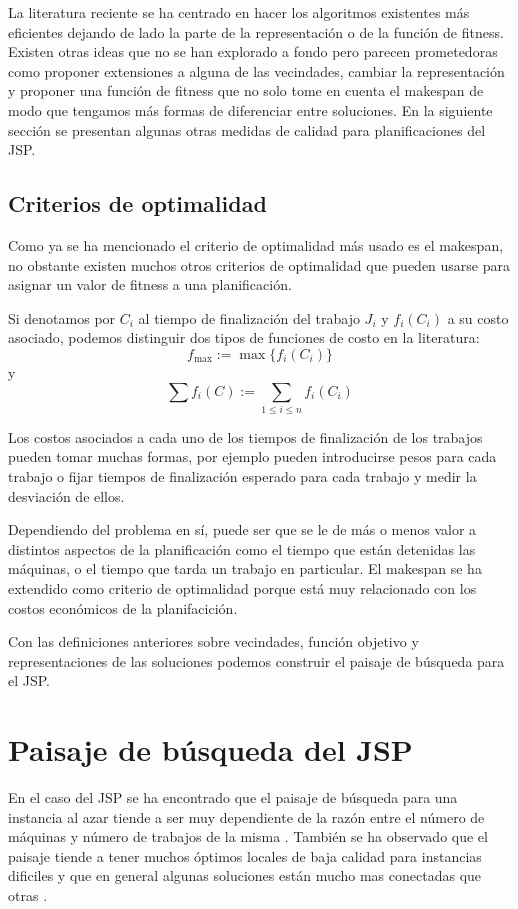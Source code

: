 La literatura reciente se ha centrado en hacer los algoritmos existentes más eficientes dejando de lado la parte de la representación o de la función de fitness. Existen otras ideas que no se han explorado a fondo pero parecen prometedoras como proponer extensiones a alguna de las vecindades, cambiar la representación y proponer una función de fitness que no solo tome en cuenta el makespan de modo que tengamos más formas de diferenciar entre soluciones. En la siguiente sección se presentan algunas otras medidas de calidad para planificaciones del JSP.
\subsection*{Criterios de optimalidad}
Como ya se ha mencionado el criterio de optimalidad más usado es el makespan, no obstante existen muchos otros criterios de optimalidad que pueden usarse para asignar un valor de fitness a una planificación. 

Si denotamos por $C_i$ al tiempo de finalización del trabajo $J_i$ y $f_i(C_i)$ a su costo asociado, podemos distinguir dos tipos de funciones de costo en la literatura\cite{Brucker2001}:
\[f_{\max}:=\max\{f_i(C_i)\}\]
y 
\[\sum f_i(C):=\sum_{1\leq i\leq n}f_i(C_i)\]

Los costos asociados a cada uno de los tiempos de finalización de los trabajos pueden tomar muchas formas, por ejemplo pueden introducirse pesos para cada trabajo o fijar tiempos de finalización esperado para cada trabajo y medir la desviación de ellos.

Dependiendo del problema en sí, puede ser que se le de más o menos valor a distintos aspectos de la planificación como el tiempo que están detenidas las máquinas, o el tiempo que tarda un trabajo en particular. El makespan se ha extendido como criterio de optimalidad porque está muy relacionado con los costos económicos de la planifacición\cite{Rand1977}.


Con las definiciones anteriores sobre vecindades, función objetivo y representaciones de las soluciones podemos construir el paisaje de búsqueda para el JSP. 

\section{Paisaje de búsqueda del JSP}
En el caso del JSP se ha encontrado que el paisaje de búsqueda para una instancia al azar tiende a ser muy dependiente de la razón entre el número de máquinas y número de trabajos de la misma \cite{Streeter2006}. También se ha observado que el paisaje tiende a tener muchos óptimos locales de baja calidad para instancias dificiles \cite{mattfeld1999search} y que en general algunas soluciones están mucho mas conectadas que otras \cite{bierwirth2004landscape}. 

